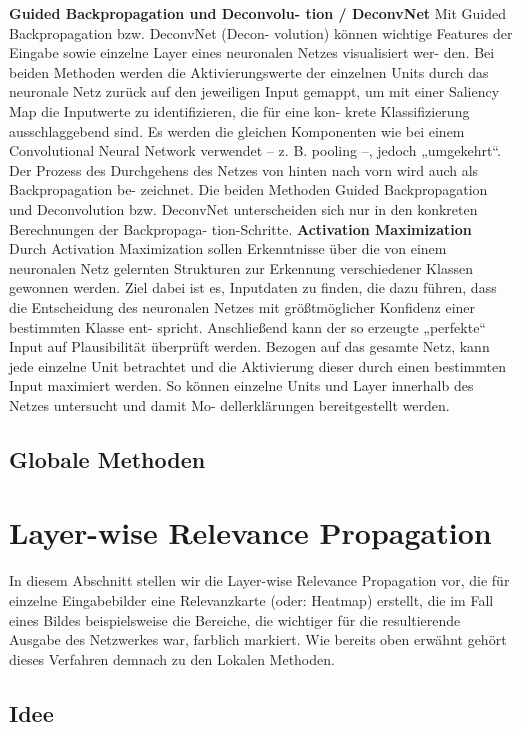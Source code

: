 \documentclass[11pt,a4paper]{article}
\numberwithin{equation}{section}
\begin{document}
	
	\noindent \textbf{Guided Backpropagation und Deconvolu-
		tion / DeconvNet}
	Mit Guided Backpropagation bzw. DeconvNet (Decon-
	volution) können wichtige Features der Eingabe sowie
	einzelne Layer eines neuronalen Netzes visualisiert wer-
	den. Bei beiden Methoden werden die Aktivierungswerte
	der einzelnen Units durch das neuronale Netz zurück
	auf den jeweiligen Input gemappt, um mit einer Saliency
	Map die Inputwerte zu identifizieren, die für eine kon-
	krete Klassifizierung ausschlaggebend sind. Es werden
	die gleichen Komponenten wie bei einem Convolutional
	Neural Network verwendet – z. B. pooling –, jedoch
	„umgekehrt“. Der Prozess des Durchgehens des Netzes
	von hinten nach vorn wird auch als Backpropagation be-
	zeichnet. Die beiden Methoden Guided Backpropagation
	und Deconvolution bzw. DeconvNet unterscheiden sich
	nur in den konkreten Berechnungen der Backpropaga-
	tion-Schritte.
	\noindent \textbf{Activation Maximization}
	Durch Activation Maximization sollen Erkenntnisse über
	die von einem neuronalen Netz gelernten Strukturen zur
	Erkennung verschiedener Klassen gewonnen werden.
	Ziel dabei ist es, Inputdaten zu finden, die dazu führen,
	dass die Entscheidung des neuronalen Netzes mit
	größtmöglicher Konfidenz einer bestimmten Klasse ent-
	spricht. Anschließend kann der so erzeugte „perfekte“
	Input auf Plausibilität überprüft werden. Bezogen auf
	das gesamte Netz, kann jede einzelne Unit betrachtet
	und die Aktivierung dieser durch einen bestimmten
	Input maximiert werden. So können einzelne Units und
	Layer innerhalb des Netzes untersucht und damit Mo-
	dellerklärungen bereitgestellt werden.
	
	\subsection{Globale Methoden}
	
	\section{Layer-wise Relevance Propagation} \label{chapter_lrp}
	In diesem Abschnitt stellen wir die Layer-wise Relevance Propagation vor, die für einzelne Eingabebilder eine Relevanzkarte (oder: Heatmap) erstellt, die im Fall eines Bildes beispielsweise die Bereiche, die wichtiger für die resultierende Ausgabe des Netzwerkes war, farblich markiert. Wie bereits oben erwähnt gehört dieses Verfahren demnach zu den Lokalen Methoden.
	
	\subsection{Idee}
	
\end{document}
